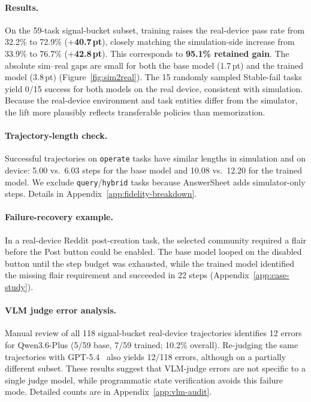 \documentclass[11pt]{article}
\begin{document}
\paragraph{Results.} On the 59-task signal-bucket subset, training raises the real-device pass rate from 32.2\% to 72.9\% (\textbf{$+$40.7\,pt}), closely matching the simulation-side increase from 33.9\% to 76.7\% (\textbf{$+$42.8\,pt}). This corresponds to \textbf{95.1\% retained gain}. The absolute sim--real gaps are small for both the base model (1.7\,pt) and the trained model (3.8\,pt) (Figure~\ref{fig:sim2real}). The 15 randomly sampled Stable-fail tasks yield 0/15 success for both models on the real device, consistent with simulation. Because the real-device environment and task entities differ from the simulator, the lift more plausibly reflects transferable policies than memorization.

\paragraph{Trajectory-length check.} Successful trajectories on \texttt{operate} tasks have similar lengths in simulation and on device: 5.00 vs.\ 6.03 steps for the base model and 10.08 vs.\ 12.20 for the trained model. We exclude \texttt{query}/\texttt{hybrid} tasks because AnswerSheet adds simulator-only steps. Details in Appendix~\ref{app:fidelity-breakdown}.

\paragraph{Failure-recovery example.} In a real-device Reddit post-creation task, the selected community required a flair before the Post button could be enabled. The base model looped on the disabled button until the step budget was exhausted, while the trained model identified the missing flair requirement and succeeded in 22 steps (Appendix~\ref{app:case-study}).

\paragraph{VLM judge error analysis.} Manual review of all 118 signal-bucket real-device trajectories identifies 12 errors for Qwen3.6-Plus (5/59 base, 7/59 trained; 10.2\% overall). Re-judging the same trajectories with GPT-5.4~\cite{GPT54} also yields 12/118 errors, although on a partially different subset. These results suggest that VLM-judge errors are not specific to a single judge model, while programmatic state verification avoids this failure mode. Detailed counts are in Appendix~\ref{app:vlm-audit}.
\end{document}
